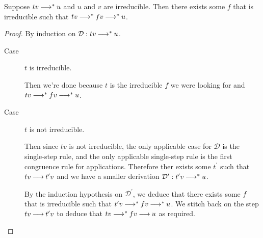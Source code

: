 \documentclass[11pt,letterpaper]{article}
\begin{document}
\begin{lem}
  \label{lem:midway-reducible-2}
  Suppose $t v \mathbin{\longrightarrow}^* u$ and $u$ and $v$ are irreducible.
  Then there exists some $f$ that is irreducible such that
  $t v \mathbin{\longrightarrow}^* f v \mathbin{\longrightarrow}^* u$.
\end{lem}

\begin{proof}
  By induction on $\mathcal{D} : t v \mathbin{\longrightarrow}^* u$.

  \begin{description}
    \item[Case] $t$ is irreducible.

      Then we're done because $t$ is the irreducible $f$ we were looking for
      and $t v \mathbin{\longrightarrow}^* f v \mathbin{\longrightarrow}^* u$.

    \item[Case] $t$ is not irreducible.

      Then since $t v$ is not irreducible, the only applicable case for
      $\mathcal{D}$ is the single-step rule, and the only applicable
      single-step rule is the first congruence rule for applications.
      Therefore ther exists some $t^\prime$ such that $t v \mathbin{\longrightarrow} t^\prime v$
      and we have a smaller derivation
      $\mathcal{D}^\prime : t^\prime v \mathbin{\longrightarrow}^* u$.

      By the induction hypothesis on $\mathcal{D}^\prime$, we deduce that there
      exists some $f$ that is irreducible such that
      $t^\prime v \mathbin{\longrightarrow}^* f v \mathbin{\longrightarrow}^* u$.
      We stitch back on the step $t v \mathbin{\longrightarrow} t^\prime v$ to deduce that
      $t v \mathbin{\longrightarrow}^* f v \mathbin{\longrightarrow} u$ as required.
  \end{description}
\end{proof}
\end{document}
